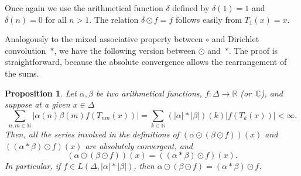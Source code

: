 \documentclass[10pt,a4paper]{amsart}
\theoremstyle{plain}
\newtheorem{proposition}{Proposition}
\theoremstyle{remark}
\newcommand{\N}{\mathbb{N}}
\newcommand{\R}{\mathbb{R}}
\newcommand{\C}{\mathbb{C}}
\begin{document}
Once again we use the arithmetical function $\delta$ defined by
$\delta(1) = 1$ and $\delta(n) = 0$ for all $n > 1$.
The relation $\delta \odot f = f$ follows easily from $T_1(x) = x$.

Analogously to the mixed associative property between $\circ$
and Dirichlet convolution~$*$, we have the following version between $\odot$ and~$*$.
The proof is straightforward, because the absolute convergence
allows the rearrangement of the sums.

\begin{proposition}
\label{pro:mixed}
Let $\alpha, \beta$ be two arithmetical functions, $f: \Delta \to \R$
(or~$\C$), and suppose at a given $x \in \Delta$
\begin{equation}
\label{eq:conabs}
  \sum_{n,m \in \N} |\alpha(n) \beta(m) f(T_{nm}(x))|
  = \sum_{k \in \N} (|\alpha| * |\beta|)(k) |f(T_k(x))|
  < \infty.
\end{equation}
Then, all the series involved in the definitions of 
$(\alpha \odot (\beta \odot f))(x)$ and $((\alpha * \beta) \odot f)(x)$
are absolutely convergent, and
\begin{equation*}
  (\alpha \odot (\beta \odot f))(x)
  = ((\alpha * \beta) \odot f)(x).
\end{equation*}
In particular, if $f \in L(\Delta,|\alpha|*|\beta|)$, then
$\alpha \odot (\beta \odot f) = (\alpha * \beta) \odot f$.
\end{proposition}

\end{document}
